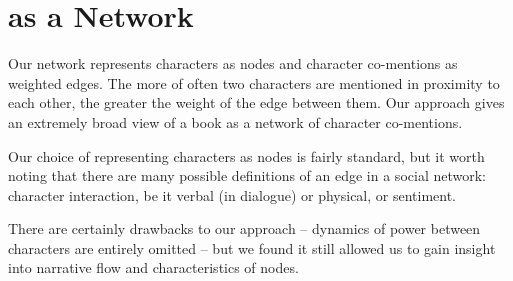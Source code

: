 \section{\infinitejest as a Network}

Our network represents characters as nodes and character co-mentions as weighted edges. The more of often two characters are mentioned in proximity to each other, the greater the weight of the edge between them. Our approach gives an extremely broad view of a book as a network of character co-mentions.

Our choice of representing characters as nodes is fairly standard, but it worth noting that there are many possible definitions of an edge in a social network: character interaction, be it verbal (in dialogue) or physical, or sentiment. 

There are certainly drawbacks to our approach -- dynamics of power between characters are entirely omitted -- but we found it still allowed us to gain insight into narrative flow and characteristics of nodes.

